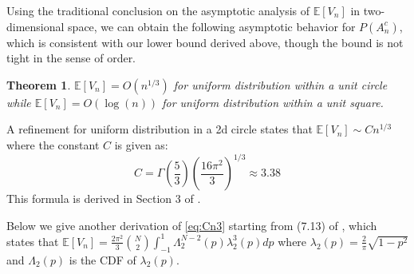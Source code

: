 \documentclass{article}
\newtheorem{theorem}{Theorem}
\def\E{\mathbb{E}}
\begin{document}
Using the traditional conclusion on the
asymptotic analysis of $\E[V_n]$
in two-dimensional space,
we can obtain the following
asymptotic behavior for $P(A_n^c)$,
which is consistent with our lower bound
derived above, though the bound is
not tight in the sense of order.
\begin{theorem}
    $\E[V_n] = O(n^{1/3})$ for uniform distribution
    within a unit circle while
    $\E[V_n] = O(\log(n))$ for uniform distribution
    within a unit square.
\end{theorem}
A refinement for uniform distribution in a 2d circle states that $\E[V_n] \sim C n^{1/3}$ where
the constant $C$ is given as:
\begin{equation}\label{eq:Cn3}
    C = \Gamma\left(\frac{5}{3}\right) \left(\frac{16\pi^2}{3}
    \right)^{1/3} \approx 3.38
\end{equation}
This formula is derived in
Section 3 of \cite{renyi1963konvexe}.

Below we give another derivation of
\eqref{eq:Cn3} starting from (7.13)
of \cite{efron1965convex}, which states that
$\E[V_n] = \frac{2\pi^2}{3}\binom{N}{2}
\int_{-1}^{1} \Lambda_2^{N-2}(p)\lambda_2^3(p)dp$
where $\lambda_2(p) = \frac{2}{\pi}\sqrt{1-p^2}$
and $\Lambda_2(p)$ is the CDF of $\lambda_2(p)$.
\end{document}
